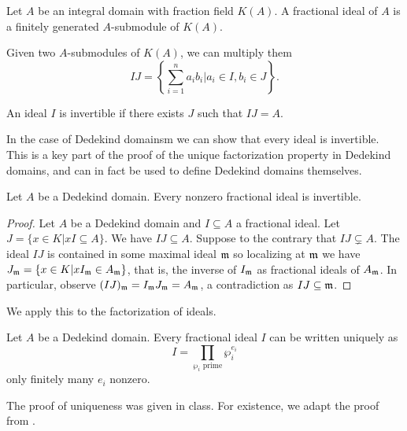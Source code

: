 \begin{definition}
  Let $A$ be an integral domain with fraction field $K(A)$. A fractional ideal of $A$ is a finitely generated $A$-submodule of $K(A)$. 
\end{definition}
Given two $A$-submodules of $K(A)$, we can multiply them 
$$IJ=\left\{\sum_{i=1}^{n}a_{i}b_{i}|a_{i}\in I,b_{i}\in J\right\}.$$
\begin{definition}[Invertible]
  An ideal $I$ is invertible if there exists $J$ such that $IJ=A$. 
\end{definition}
In the case of Dedekind domainsm we can show that every ideal is invertible. This is a key part of the proof of the unique factorization property in Dedekind domains, and can in fact be used to define Dedekind domains themselves. 
\begin{proposition}
  Let $A$ be a Dedekind domain. Every nonzero fractional ideal is invertible. 
\end{proposition}
\begin{proof}
  Let $A$ be a Dedekind domain and $I\subseteq A$ a fractional ideal. Let $J=\{x\in K|xI\subseteq A\}$. We have $IJ\subseteq A$. Suppose to the contrary that $IJ\subsetneq A$. The ideal $IJ$ is contained in some maximal ideal $\mathfrak{m}$ so localizing at $\mathfrak{m}$ we have $J_{\mathfrak{m}}=\{x\in K|x I_{\mathfrak{m}}\in A_{\mathfrak{m}}\}$, that is, the inverse of $I_{\mathfrak{m}}$ as fractional ideals of $A_{\mathfrak{m}}$. In particular, observe $(IJ)_{\mathfrak{m}}=I_{\mathfrak{m}}J_{\mathfrak{m}}=A_{\mathfrak{m}}$, a contradiction as $IJ\subseteq\mathfrak{m}$. 
\end{proof}
We apply this to the factorization of ideals. 
\begin{theorem}
  Let $A$ be a Dedekind domain. Every fractional ideal $I$ can be written uniquely as 
  $$I=\prod_{\wp_{i}\text{ prime}}\wp_{i}^{e_{i}}$$
  only finitely many $e_{i}$ nonzero. 
\end{theorem}
The proof of uniqueness was given in class. For existence, we adapt the proof from \cite[\S 3, Thm. 14]{Marcus}.
